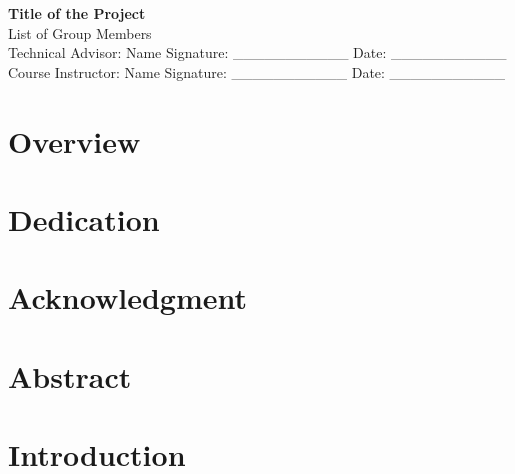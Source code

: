 \documentclass[12pt]{article}
\begin{document}
\begin{titlepage}
    \centering
    \vspace*{0.5 cm}
    \textbf{\Large Title of the Project}\\[0.5 cm]
    List of Group Members\\[0.5 cm]
    Technical Advisor: Name \hfill Signature: \_\_\_\_\_\_\_\_\_\_\_ Date: \_\_\_\_\_\_\_\_\_\_\_\\[0.5 cm]
    Course Instructor: Name \hfill Signature: \_\_\_\_\_\_\_\_\_\_\_ Date: \_\_\_\_\_\_\_\_\_\_\_\\[0.5 cm]
    \vfill
\end{titlepage}

\section*{Overview}
\lipsum[1-4] %

\section*{Dedication}
\lipsum[1] %

\section*{Acknowledgment}
\lipsum[1] %

\tableofcontents
\pagebreak

\listoftables
\pagebreak

\listoffigures
\pagebreak

\section*{Abstract}
\lipsum[1] %

\section{Introduction}
\lipsum[2-3] %
\end{document}
